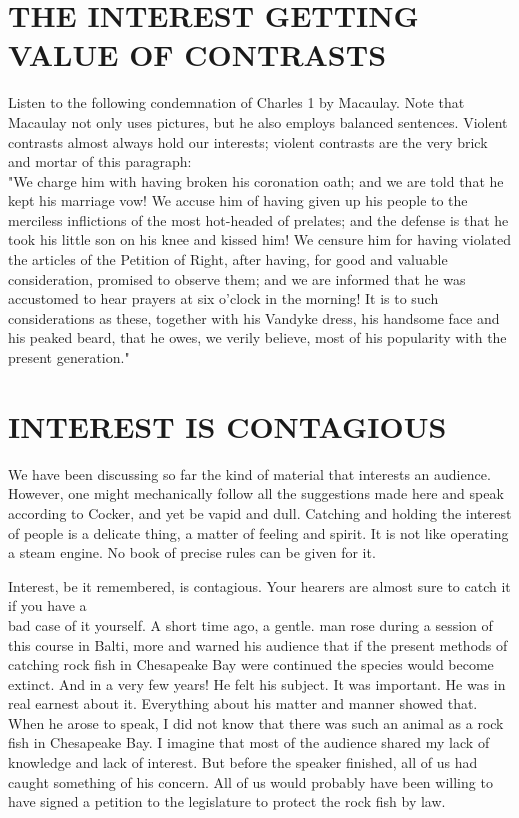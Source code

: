 \documentclass[10pt]{article}
\begin{document}
\section*{THE INTEREST GETTING VALUE OF CONTRASTS}
Listen to the following condemnation of Charles 1 by Macaulay. Note that Macaulay not only uses pictures, but he also employs balanced sentences. Violent contrasts almost always hold our interests; violent contrasts are the very brick and mortar of this paragraph:\\
"We charge him with having broken his coronation oath; and we are told that he kept his marriage vow! We accuse him of having given up his people to the merciless inflictions of the most hot-headed of prelates; and the defense is that he took his little son on his knee and kissed him! We censure him for having violated the articles of the Petition of Right, after having, for good and valuable consideration, promised to observe them; and we are informed that he was accustomed to hear prayers at six o'clock in the morning! It is to such considerations as these, together with his Vandyke dress, his handsome face and his peaked beard, that he owes, we verily believe, most of his popularity with the present generation."

\section*{INTEREST IS CONTAGIOUS}
We have been discussing so far the kind of material that interests an audience. However, one might mechanically follow all the suggestions made here and speak according to Cocker, and yet be vapid and dull. Catching and holding the interest of people is a delicate thing, a matter of feeling and spirit. It is not like operating a steam engine. No book of precise rules can be given for it.

Interest, be it remembered, is contagious. Your hearers are almost sure to catch it if you have a\\
bad case of it yourself. A short time ago, a gentle. man rose during a session of this course in Balti, more and warned his audience that if the present methods of catching rock fish in Chesapeake Bay were continued the species would become extinct. And in a very few years! He felt his subject. It was important. He was in real earnest about it. Everything about his matter and manner showed that. When he arose to speak, I did not know that there was such an animal as a rock fish in Chesapeake Bay. I imagine that most of the audience shared my lack of knowledge and lack of interest. But before the speaker finished, all of us had caught something of his concern. All of us would probably have been willing to have signed a petition to the legislature to protect the rock fish by law.
\end{document}
